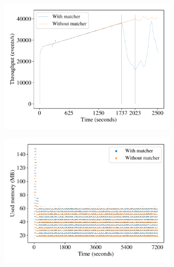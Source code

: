 \begin{figure}[t!]
    \centering
    \begin{subfigure}[t]{0.33\textwidth}
        \centering
        \includegraphics[width=1.0\textwidth]{figures/diffstream/throughput-accelerated.pdf}
        \caption{}\label{fig:throughput}
    \end{subfigure}%
    \begin{subfigure}[t]{0.33\textwidth}
        \centering
        \includegraphics[width=1.0\textwidth]{figures/diffstream/used_memory_in_time.pdf}
        \caption{}\label{fig:memory-in-time}
    \end{subfigure}%
    \begin{subfigure}[t]{0.33\textwidth}

\end{subfigure}
\end{figure}
